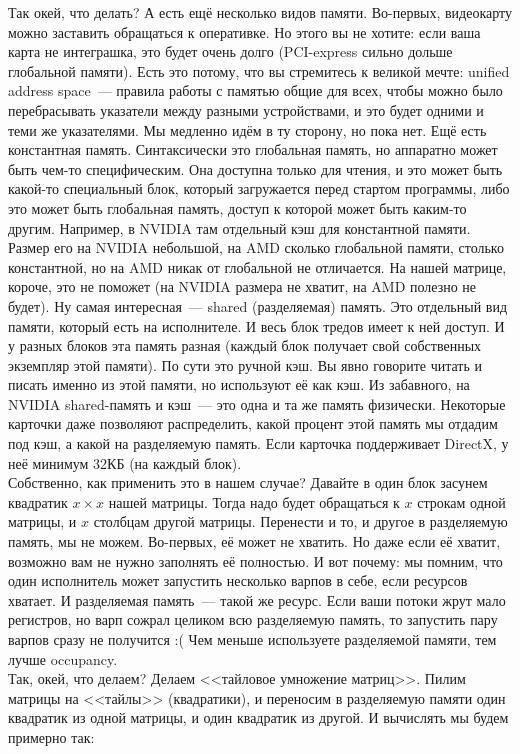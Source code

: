 \documentclass{article}
\begin{document}
    Так окей, что делать? А есть ещё несколько видов памяти. Во-первых, видеокарту можно заставить обращаться к оперативке. Но этого вы не хотите: если ваша карта не интеграшка, это будет очень долго (PCI-express сильно дольше глобальной памяти). Есть это потому, что вы стремитесь к великой мечте: unified address space~--- правила работы с памятью общие для всех, чтобы можно было перебрасывать указатели между разными устройствами, и это будет одними и теми же указателями. Мы медленно идём в ту сторону, но пока нет. Ещё есть константная память. Синтаксически это глобальная память, но аппаратно может быть чем-то специфическим. Она доступна только для чтения, и это может быть какой-то специальный блок, который загружается перед стартом программы, либо это может быть глобальная память, доступ к которой может быть каким-то другим. Например, в NVIDIA там отдельный кэш для константной памяти. Размер его на NVIDIA небольшой, на AMD сколько глобальной памяти, столько константной, но на AMD никак от глобальной не отличается. На нашей матрице, короче, это не поможет (на NVIDIA размера не хватит, на AMD полезно не будет). Ну самая интересная~--- shared (разделяемая) память. Это отдельный вид памяти, который есть на исполнителе. И весь блок тредов имеет к ней доступ. И у разных блоков эта память разная (каждый блок получает свой собственных экземпляр этой памяти). По сути это ручной кэш. Вы явно говорите читать и писать именно из этой памяти, но используют её как кэш. Из забавного, на NVIDIA shared-память и кэш~--- это одна и та же память физически. Некоторые карточки даже позволяют распределить, какой процент этой память мы отдадим под кэш, а какой на разделяемую память. Если карточка поддерживает DirectX, у неё минимум 32КБ (на каждый блок).\\
    Собственно, как применить это в нашем случае? Давайте в один блок засунем квадратик $x\times x$ нашей матрицы. Тогда надо будет обращаться к $x$ строкам одной матрицы, и $x$ столбцам другой матрицы. Перенести и то, и другое в разделяемую память, мы не можем. Во-первых, её может не хватить. Но даже если её хватит, возможно вам не нужно заполнять её полностью. И вот почему: мы помним, что один исполнитель может запустить несколько варпов в себе, если ресурсов хватает. И разделяемая память~--- такой же ресурс. Если ваши потоки жрут мало регистров, но варп сожрал целиком всю разделяемую память, то запустить пару варпов сразу не получится :( Чем меньше используете разделяемой памяти, тем лучше occupancy.\\
    Так, окей, что делаем? Делаем <<тайловое умножение матриц>>. Пилим матрицы на <<тайлы>> (квадратики), и переносим в разделяемую памяти один квадратик из одной матрицы, и один квадратик из другой. И вычислять мы будем примерно так:
\end{document}
